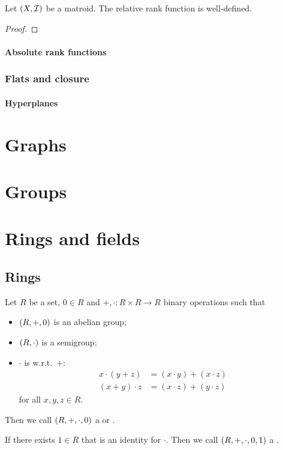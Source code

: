 \begin{lemma}
Let $\left( X,\mathcal{I} \right)$ be a matroid. The relative rank function is well-defined.
\end{lemma}
\begin{proof}

\end{proof}

\subsubsection{Absolute rank functions}

\subsection{Flats and closure}

\subsubsection{Hyperplanes}


\chapter{Graphs}


\chapter{Groups}



\chapter{Rings and fields}
\section{Rings}
\begin{definition}
Let $R$ be a set, $0\in R$ and $+,\cdot: R\times R\to R$ binary operations such that
\begin{itemize}
\item $\left( R,+,0 \right)$ is an abelian group;
\item $\left( R,\cdot \right)$ is a semigroup;
\item $\cdot$ is  w.r.t.\ $+$:
\begin{align*}
x\cdot (y+z) &= (x\cdot y) + (x\cdot z) \\
(x+y)\cdot z &= (x\cdot z) + (y\cdot z)
\end{align*}
for all $x,y,z\in R$.
\end{itemize}
Then we call $\left( R, +,\cdot, 0 \right)$ a  or .

If there exists $1\in R$ that is an identity for $\cdot$. Then we call $\left( R,+,\cdot,0,1 \right)$ a .
\end{definition}

